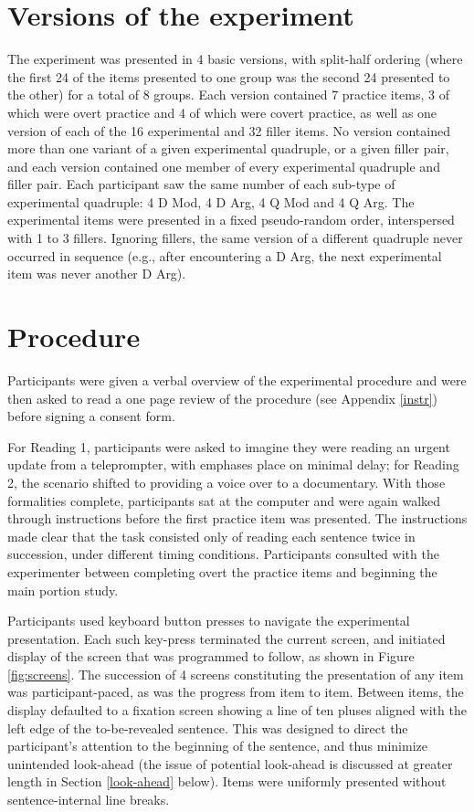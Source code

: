 \documentclass[11pt,oneside]{book}
\begin{document}
\hypertarget{versions-of-the-experiment}{%
\section{Versions of the experiment}\label{versions-of-the-experiment}}

The experiment was presented in 4 basic versions, with split-half ordering (where the first 24 of the items presented to one group was the second 24 presented to the other) for a total of 8 groups. Each version contained 7 practice items, 3 of which were overt practice and 4 of which were covert practice, as well as one version of each of the 16 experimental and 32 filler items. No version contained more than one variant of a given experimental quadruple, or a given filler pair, and each version contained one member of every experimental quadruple and filler pair. Each participant saw the same number of each sub-type of experimental quadruple: 4 D Mod, 4 D Arg, 4 Q Mod and 4 Q Arg. The experimental items were presented in a fixed pseudo-random order, interspersed with 1 to 3 fillers. Ignoring fillers, the same version of a different quadruple never occurred in sequence (e.g., after encountering a D Arg, the next experimental item was never another D Arg).

\hypertarget{procedure}{%
\section{Procedure}\label{procedure}}

Participants were given a verbal overview of the experimental procedure and were then asked to read a one page review of the procedure (see Appendix \ref{instr}) before signing a consent form.

For Reading 1, participants were asked to imagine they were reading an urgent update from a teleprompter, with emphases place on minimal delay; for Reading 2, the scenario shifted to providing a voice over to a documentary. With those formalities complete, participants sat at the computer and were again walked through instructions before the first practice item was presented. The instructions made clear that the task consisted only of reading each sentence twice in succession, under different timing conditions. Participants consulted with the experimenter between completing overt the practice items and beginning the main portion study.

Participants used keyboard button presses to navigate the experimental presentation. Each such key-press terminated the current screen, and initiated display of the screen that was programmed to follow, as shown in Figure \ref{fig:screens}. The succession of 4 screens constituting the presentation of any item was participant-paced, as was the progress from item to item. Between items, the display defaulted to a fixation screen showing a line of ten pluses aligned with the left edge of the to-be-revealed sentence. This was designed to direct the participant's attention to the beginning of the sentence, and thus minimize unintended look-ahead (the issue of potential look-ahead is discussed at greater length in Section \ref{look-ahead} below). Items were uniformly presented without sentence-internal line breaks.
\end{document}
